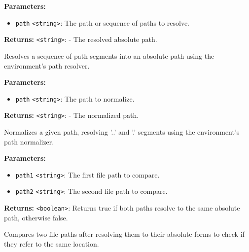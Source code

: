 \documentclass[12pt,a4paper]{article}
\begin{document}
\vspace{5mm}
\noindent {}


\noindent \textbf{Parameters:}
\begin{itemize}
  \item \texttt{path} \texttt{<string>}: The path or sequence of paths to resolve.
\end{itemize}

\noindent \textbf{Returns:} \texttt{<string>}: - The resolved absolute path.

\noindent Resolves a sequence of path segments into an absolute path using the environment's path resolver.

\vspace{5mm}
\noindent {}


\noindent \textbf{Parameters:}
\begin{itemize}
  \item \texttt{path} \texttt{<string>}: The path to normalize.
\end{itemize}

\noindent \textbf{Returns:} \texttt{<string>}: - The normalized path.

\noindent Normalizes a given path, resolving '..' and '.' segments using the environment's path normalizer.

\vspace{5mm}
\noindent {}


\noindent \textbf{Parameters:}
\begin{itemize}
  \item \texttt{path1} \texttt{<string>}: The first file path to compare.
  \item \texttt{path2} \texttt{<string>}: The second file path to compare.
\end{itemize}

\noindent \textbf{Returns:} \texttt{<boolean>}: Returns true if both paths resolve to the same absolute path, otherwise false.

\noindent Compares two file paths after resolving them to their absolute forms to check if they refer to the same location.
\end{document}
